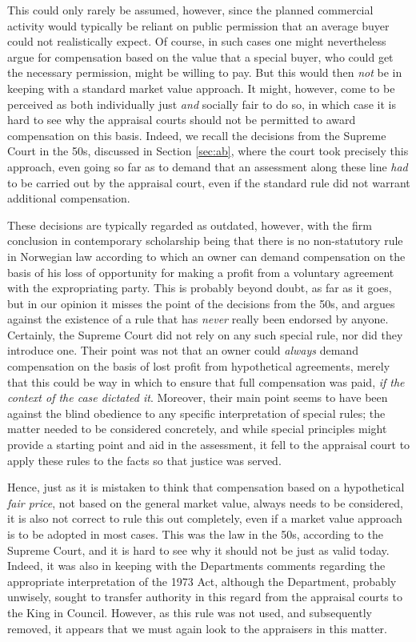This could only rarely be assumed, however, since the planned commercial activity would typically be reliant on public permission that an average buyer could not realistically expect. Of course, in such cases one might nevertheless argue for compensation based on the value that a special buyer, who could get the necessary permission, might be willing to pay. But this would then \emph{not} be in keeping with a standard market value approach. It might, however, come to be perceived as both individually just \emph{and} socially fair to do so, in which case it is hard to see why the appraisal courts should not be permitted to award compensation on this basis. Indeed, we recall the decisions from the Supreme Court in the 50s, discussed in Section \ref{sec:ab}, where the court took precisely this approach, even going so far as to demand that an assessment along these line \emph{had} to be carried out by the appraisal court, even if the standard rule did not warrant additional compensation.

These decisions are typically regarded as outdated, however, with the firm conclusion in contemporary scholarship being that there is no non-statutory rule in Norwegian law according to which an owner can demand compensation on the basis of his loss of opportunity for making a profit from a voluntary agreement with the expropriating party. This is probably beyond doubt, as far as it goes, but in our opinion it misses the point of the decisions from the 50s, and argues against the existence of a rule that has \emph{never} really been endorsed by anyone. Certainly, the Supreme Court did not rely on any such special rule, nor did they introduce one. Their point was not that an owner could \emph{always} demand compensation on the basis of lost profit from hypothetical agreements, merely that this could be way in which to ensure that full compensation was paid, \emph{if the context of the case dictated it}. Moreover, their main point seems to have been against the blind obedience to any specific interpretation of special rules; the matter needed to be considered concretely, and while special principles might provide a starting point and aid in the assessment, it fell to the appraisal court to apply these rules to the facts so that justice was served.

Hence, just as it is mistaken to think that compensation based on a hypothetical \emph{fair price}, not based on the general market value, always needs to be considered, it is also not correct to rule this out completely, even if a market value approach is to be adopted in most cases. This was the law in the 50s, according to the Supreme Court, and it is hard to see why it should not be just as valid today. Indeed, it was also in keeping with the Departments comments regarding the appropriate interpretation of the 1973 Act, although the Department, probably unwisely, sought to transfer authority in this regard from the appraisal courts to the King in Council. However, as this rule was not used, and subsequently removed, it appears that we must again look to the appraisers in this matter.

